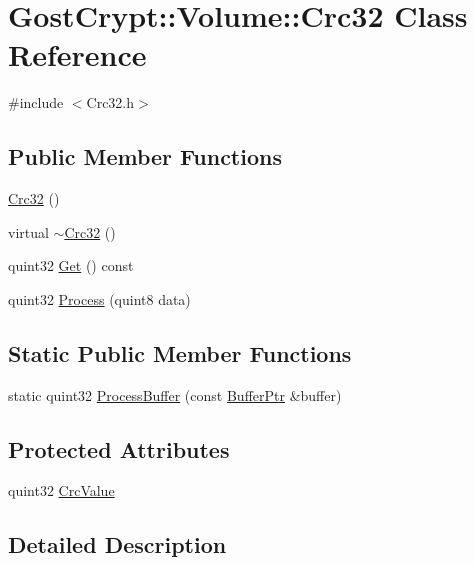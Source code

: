 \hypertarget{class_gost_crypt_1_1_volume_1_1_crc32}{}\section{Gost\+Crypt\+:\+:Volume\+:\+:Crc32 Class Reference}
\label{class_gost_crypt_1_1_volume_1_1_crc32}


{\ttfamily \#include $<$Crc32.\+h$>$}

\subsection*{Public Member Functions}
\begin{DoxyCompactItemize}
\item 
\hyperlink{class_gost_crypt_1_1_volume_1_1_crc32_a418222806ec52e3b95a0746e0c035f2e}{Crc32} ()
\item 
virtual \hyperlink{class_gost_crypt_1_1_volume_1_1_crc32_a939faeafc1eddb95267fc474ed60cd04}{$\sim$\+Crc32} ()
\item 
quint32 \hyperlink{class_gost_crypt_1_1_volume_1_1_crc32_a601a506f97c90006e604af92b9c0f242}{Get} () const
\item 
quint32 \hyperlink{class_gost_crypt_1_1_volume_1_1_crc32_aab8611a67b50a47901f5b5bbf485e4ae}{Process} (quint8 data)
\end{DoxyCompactItemize}
\subsection*{Static Public Member Functions}
\begin{DoxyCompactItemize}
\item 
static quint32 \hyperlink{class_gost_crypt_1_1_volume_1_1_crc32_a2edf1d5466c4a1ae44712e253bbaccd2}{Process\+Buffer} (const \hyperlink{class_gost_crypt_1_1_buffer_ptr}{Buffer\+Ptr} \&buffer)
\end{DoxyCompactItemize}
\subsection*{Protected Attributes}
\begin{DoxyCompactItemize}
\item 
quint32 \hyperlink{class_gost_crypt_1_1_volume_1_1_crc32_af33604ae677c98ac06ecb32f9a482305}{Crc\+Value}
\end{DoxyCompactItemize}


\subsection{Detailed Description}


